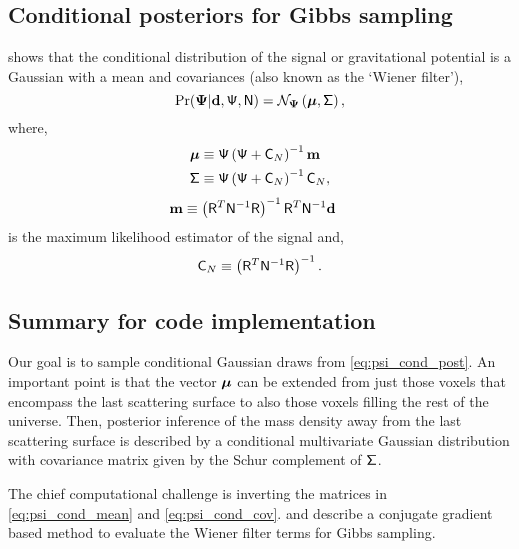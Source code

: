 \documentclass[11pt, letterpaper]{article}
\begin{document}
\subsection{Conditional posteriors for Gibbs sampling}

\citet{Wandelt:2003uk} shows that the conditional distribution
of the signal or gravitational potential is a Gaussian with a
mean and covariances (also known as the `Wiener filter'),
\begin{equation}\label{eq:psi_cond_post}
	{\rm Pr}(\bm \Psi | \mathbf{d}, \mathsf{\Psi}, \mathsf{N})
	= \mathcal{N}_{\bm \Psi}
	\left(\bm \mu, \mathsf{\Sigma}\right),
\end{equation}
where,
\begin{align}
	\bm \mu &\equiv \mathsf{\Psi}
	\left(\mathsf{\Psi} + \mathsf{C}_{N}\right)^{-1}\mathbf{m}
	\label{eq:psi_cond_mean}
	\\
	\mathsf{\Sigma} &\equiv
	\mathsf{\Psi}
	\left(\mathsf{\Psi} + \mathsf{C}_{N}\right)^{-1} \mathsf{C}_{N},
	\label{eq:psi_cond_cov}
\end{align}
\begin{align}
	\mathbf{m} &\equiv
	\left(\mathsf{R}^{T} \mathsf{N}^{-1}\mathsf{R}\right)^{-1}
	\mathsf{R}^{T}\mathsf{N}^{-1} \mathbf{d}
\end{align}
is the maximum likelihood estimator of the signal and,
\begin{equation}
	\mathsf{C}_{N} \equiv \left(\mathsf{R}^{T} \mathsf{N}^{-1}\mathsf{R}\right)^{-1}.
\end{equation}


\subsection{Summary for code implementation}

Our goal is to sample conditional Gaussian draws from \autoref{eq:psi_cond_post}.
An important point is that the vector $\bm \mu$ can be extended from just those
voxels that encompass the last scattering surface to also those voxels
filling the rest of the universe. Then, posterior inference of the mass density
away from the last scattering surface is described by a conditional
multivariate Gaussian distribution with covariance matrix given by the
Schur complement of $\mathsf{\Sigma}$.

The chief computational challenge is inverting the matrices in
\autoref{eq:psi_cond_mean} and \autoref{eq:psi_cond_cov}.
\citet{Wandelt:2003uk} and \citet{Wandelt:2004ul} describe
a conjugate gradient based method to evaluate the Wiener filter terms for
Gibbs sampling.
\end{document}
